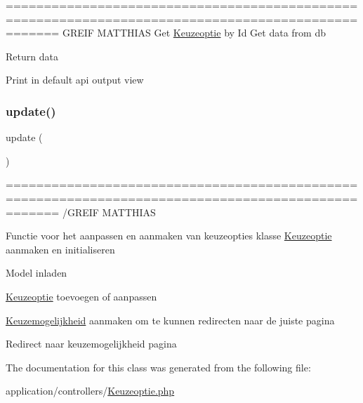 =================================================================================================== G\+R\+E\+IF M\+A\+T\+T\+H\+I\+AS Get \mbox{\hyperlink{class_keuzeoptie}{Keuzeoptie}} by Id Get data from db

Return data

Print in default api output view \mbox{\label{class_keuzeoptie_a842e4774e3b3601a005b995c02f7e883}} 
\subsubsection{\texorpdfstring{update()}{update()}}
{\footnotesize\ttfamily update (\begin{DoxyParamCaption}{ }\end{DoxyParamCaption})}



=================================================================================================== /\+G\+R\+E\+IF M\+A\+T\+T\+H\+I\+AS 

Functie voor het aanpassen en aanmaken van keuzeopties klasse \mbox{\hyperlink{class_keuzeoptie}{Keuzeoptie}} aanmaken en initialiseren

Model inladen

\mbox{\hyperlink{class_keuzeoptie}{Keuzeoptie}} toevoegen of aanpassen

\mbox{\hyperlink{class_keuzemogelijkheid}{Keuzemogelijkheid}} aanmaken om te kunnen redirecten naar de juiste pagina

Redirect naar keuzemogelijkheid pagina 

The documentation for this class was generated from the following file\+:\begin{DoxyCompactItemize}
\item 
application/controllers/\mbox{\hyperlink{_keuzeoptie_8php}{Keuzeoptie.\+php}}\end{DoxyCompactItemize}
